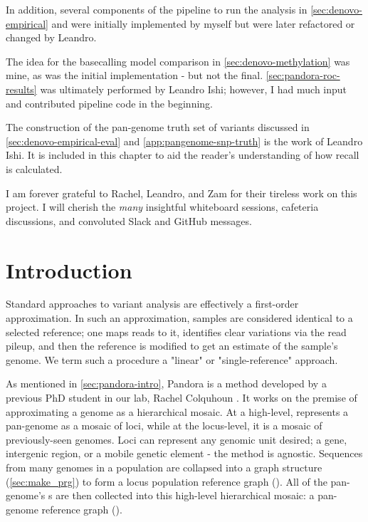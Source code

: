 In addition, several components of the pipeline to run the analysis in \autoref{sec:denovo-empirical} and \cite{pandora} were initially implemented by myself but were later refactored or changed by Leandro.

The idea for the \ont{} basecalling model comparison in \autoref{sec:denovo-methylation} was mine, as was the initial implementation - but not the final. \autoref{sec:pandora-roc-results} was ultimately performed by Leandro Ishi; however, I had much input and contributed pipeline code in the beginning.

The construction of the pan-genome truth set of variants discussed in \autoref{sec:denovo-empirical-eval} and \autoref{app:pangenome-snp-truth} is the work of Leandro Ishi. It is included in this chapter to aid the reader's understanding of how recall is calculated.

I am forever grateful to Rachel, Leandro, and Zam for their tireless work on this project. I will cherish the \emph{many} insightful whiteboard sessions, cafeteria discussions, and convoluted Slack and GitHub messages.

\section{Introduction}

 Standard approaches to variant analysis are effectively a first-order approximation. In such an approximation, samples are considered identical to a selected reference; one maps reads to it, identifies clear variations via the read pileup, and then the reference is modified to get an estimate of the sample's genome. We term such a procedure a "linear" or "single-reference" approach. 
 
 As mentioned in \autoref{sec:pandora-intro}, Pandora is a method developed by a previous PhD student in our lab, Rachel Colquhoun \cite{rachelthesis}. It works on the premise of approximating a genome as a hierarchical mosaic. At a high-level, \pandora{} represents a pan-genome as a mosaic of loci, while at the locus-level, it is a mosaic of previously-seen genomes. Loci can represent any genomic unit desired; a gene, intergenic region, or a mobile genetic element - the method is agnostic. Sequences from many genomes in a population are collapsed into a graph structure (\autoref{sec:make_prg}) to form a locus population reference graph (\prg{}). All of the pan-genome's \prg{}s are then collected into this high-level hierarchical mosaic: a pan-genome reference graph (\panrg{}).
 
